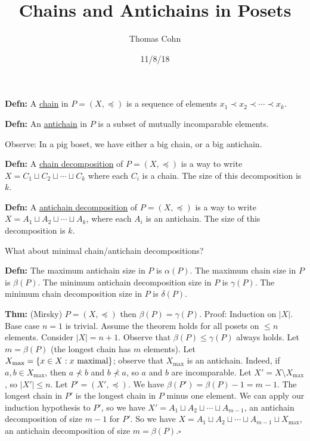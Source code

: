 \documentclass[10pt,letterpaper]{article}
\author{Thomas Cohn}
\title{Chains and Antichains in Posets}
\date{11/8/18} %
\newcommand{\n}{\hfill\break}
\newcommand{\defn}[1]{\par\noindent\settowidth{\hangindent}{\textbf{Defn: }}\textbf{Defn: }#1\n}
\newcommand{\thm}[1]{\par\noindent\settowidth{\hangindent}{\textbf{Thm: }}\textbf{Thm: }#1\n}
\newcommand{\proven}{\;$\square$\n}
\newcommand{\ptxt}[1]{\textrm{\textnormal{#1}}}
\newcommand{\card}[1]{\left|#1\right|}
\newcommand{\set}[1]{\left\{#1\right\}}
\begin{document}
\maketitle
\setlength\RaggedRightParindent{\parindent}
\RaggedRight

\defn{A \underline{chain} in $P=(X,\preceq)$ is a sequence of elements $x_{1}\prec{}x_{2}\prec\cdots\prec{}x_{k}$.}

\defn{An \underline{antichain} in $P$ is a subset of mutually incomparable elements.}

\par\noindent Observe: In a pig boset, we have either a big chain, or a big antichain.\n

\defn{A \underline{chain decomposition} of $P=(X,\preceq)$ is a way to write $X=C_{1}\sqcup{}C_{2}\sqcup\cdots\sqcup{}C_{k}$ where each $C_{i}$ is a chain. The size of this decomposition is $k$.}

\defn{A \underline{antichain decomposition} of $P=(X,\preceq)$ is a way to write $X=A_{1}\sqcup{}A_{2}\sqcup\cdots\sqcup{}A_{k}$, where each $A_{i}$ is an antichain. The size of this decomposition is $k$.}

\par\noindent What about minimal chain/antichain decompositions?\n

\defn{The maximum antichain size in $P$ is $\alpha(P)$.\n
The maximum chain size in $P$ is $\beta(P)$.\n
The minimum antichain decomposition size in $P$ is $\gamma(P)$.\n
The minimum chain decomposition size in $P$ is $\delta(P)$.}

\thm{(Mirsky) $P=(X,\preceq)$ then $\beta(P)=\gamma(P)$.\n
Proof: Induction on $\card{X}$. Base case $n=1$ is trivial. Assume the theorem holds for all posets on $\le{}n$ elements. Consider $\card{X}=n+1$.\n
Observe that $\beta(P)\le\gamma(P)$ always holds.\n
Let $m=\beta(P)$ (the longest chain has $m$ elements). Let $X_{\max}=\set{x\in{}X:x\ptxt{ maximal}}$; observe that $X_{\max}$ is an antichain. Indeed, if $a,b\in{}X_{\max}$, then $a\nprec{}b$ and $b\nprec{}a$, so $a$ and $b$ are incomparable. Let $X'=X\setminus{}X_{\max}$, so $\card{X'}\le{}n$. Let $P'=(X',\preceq)$. We have $\beta(P')=\beta(P)-1=m-1$. The longest chain in $P'$ is the longest chain in $P$ minus one element. We can apply our induction hypothesis to $P'$, so we have $X'=A_{1}\sqcup{}A_{2}\sqcup\cdots\sqcup{}A_{m-1}$, an antichain decomposition of size $m-1$ for $P'$. So we have $X=A_{1}\sqcup{}A_{2}\sqcup\cdots\sqcup{}A_{m-1}\sqcup{}X_{\max}$, an antichain decomposition of size $m=\beta(P)$.\proven}
\end{document}
